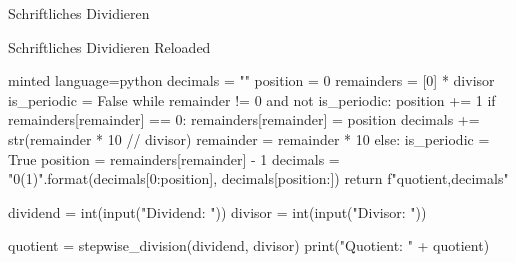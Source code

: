 \begin{task}[points=auto]{Schriftliches Dividieren}
\begin{subtask*}[points=0]{Schriftliches Dividieren Reloaded }
\begin{solution}
\begin{codeBlock}[]{minted language=python}
                    decimals = ""
                    position = 0
                    remainders = [0] * divisor
                    is_periodic = False
                    while remainder != 0 and not is_periodic:
                        position += 1
                        if remainders[remainder] == 0:
                            remainders[remainder] = position
                            decimals += str(remainder * 10 // divisor)
                            remainder = remainder * 10 %
                        else:
                            is_periodic = True
                            position = remainders[remainder] - 1
                            decimals = "{0}({1})".format(decimals[0:position], decimals[position:])
                    return f"{quotient},{decimals}"


                dividend = int(input("Dividend: "))
                divisor = int(input("Divisor: "))

                quotient = stepwise_division(dividend, divisor)
                print("Quotient: " + quotient)
            \end{codeBlock}
        \end{solution}
    \end{subtask*}
\end{task}
